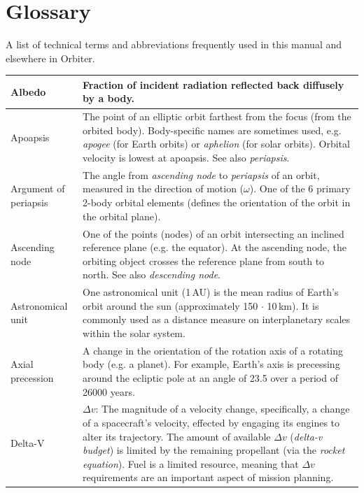\documentclass[Orbiter User Manual.tex]{subfiles}
\begin{document}
\section{Glossary}
A list of technical terms and abbreviations frequently used in this manual and
elsewhere in Orbiter.

	\footnotesize
	\begin{longtable}{ >{\RaggedRight}p{} p{} }
	\hline%
	Albedo & Fraction of incident radiation reflected back diffusely by a
		body.\\
	\hline
	Apoapsis & The point of an elliptic orbit farthest from the focus (from the
		orbited body). Body-specific names are sometimes used, e.g.
		\emph{apogee} (for Earth orbits) or \emph{aphelion} (for solar orbits).
		Orbital velocity is lowest at apoapsis. See also \emph{periapsis}.\\
	\hline
	Argument of periapsis & The angle from \textit{ascending node} to
		\emph{periapsis} of an orbit, measured in the direction of motion
		($\omega$). One of the 6 primary 2-body orbital elements (defines the
		orientation of the orbit in the orbital plane).\\
	\hline
	Ascending node & One of the points (nodes) of an orbit intersecting an
		inclined reference plane (e.g. the equator). At the ascending node, the
		orbiting object crosses the reference plane from south to north. See
		also \emph{descending node}.\\
	\hline
	Astronomical unit & One astronomical unit (1\,AU) is the mean radius of
		Earth's orbit around the sun (approximately 150 $\cdot$
		10\textsup{6}\,km). It is commonly used as a distance measure on
		interplanetary scales within the solar system.\\
	\hline
	Axial precession & A change in the orientation of the rotation axis of a
		rotating body (e.g. a planet). For example, Earth's axis is precessing
		around the ecliptic pole at an angle of 23.5\deg{} over a period of
		26000 years.\\
	\hline
	Delta-V & $\Delta v$: The magnitude of a velocity change, specifically, a
		change of a spacecraft's velocity, effected by engaging its engines to
		alter its trajectory. The amount of available $\Delta v$ (\emph{delta-v
		budget}) is limited by the remaining propellant (via the \emph{rocket
		equation}). Fuel is a limited resource, meaning that $\Delta v$
		requirements are an important aspect of mission planning.\\

\end{longtable}
\end{document}
